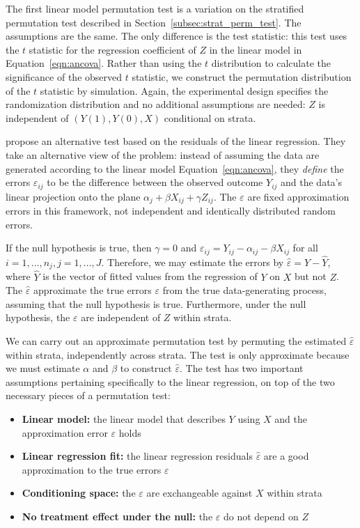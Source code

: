 \documentclass[12pt]{article}
\begin{document}
The first linear model permutation test is a variation on the stratified permutation test described in Section~\ref{subsec:strat_perm_test}.
The assumptions are the same.
The only difference is the test statistic:
this test uses the $t$ statistic for the regression coefficient of $Z$ in the linear model in Equation~\ref{eqn:ancova}.
Rather than using the $t$ distribution to calculate the significance of the observed $t$ statistic, we construct the permutation distribution of the $t$ statistic by simulation.
Again, the experimental design specifies the randomization distribution and no additional assumptions are needed:
$Z$ is independent of $(Y(1), Y(0), X)$ conditional on strata.

\citet{freedman_nonstochastic_1983} propose an alternative test based on the residuals of the linear regression.
They take an alternative view of the problem:
instead of assuming the data are generated according to the linear model Equation~\ref{eqn:ancova}, they \textit{define} the errors $\varepsilon_{ij}$ to be the difference between the observed outcome $Y_{ij}$ and the data's linear projection onto the plane $\alpha_j + \beta X_{ij}+ \gamma Z_{ij}$.
The $\varepsilon$ are fixed approximation errors in this framework, not independent and identically distributed random errors.

If the null hypothesis is true, then $\gamma = 0$ and $\varepsilon_{ij} = Y_{ij} - \alpha_{ij} - \beta X_{ij}$ for all $i = 1, \dots, n_j, j = 1, \dots, J$.
Therefore, we may estimate the errors by $\hat{\varepsilon} =Y - \hat{Y}$, where $\hat{Y}$ is the vector of fitted values from the regression of $Y$ on $X$ but not $Z$.
The $\hat{\varepsilon}$ approximate the true errors $\varepsilon$ from the true data-generating process, assuming that the null hypothesis is true.
Furthermore, under the null hypothesis, the $\varepsilon$ are independent of $Z$ within strata. 

We can carry out an approximate permutation test by permuting the estimated $\hat{\varepsilon}$ within strata, independently across strata.
The test is only approximate because we must estimate $\alpha$ and $\beta$ to construct $\hat{\varepsilon}$.
The test has two important assumptions pertaining specifically to the linear regression, on top of the two necessary pieces of a permutation test:
\begin{itemize}
\item \textbf{Linear model:} the linear model that describes $Y$ using $X$ and the approximation error $\varepsilon$ holds
\item \textbf{Linear regression fit:} the linear regression residuals $\hat{\varepsilon}$ are a good approximation to the true errors $\varepsilon$ 
\item \textbf{Conditioning space:} the $\varepsilon$ are exchangeable against $X$ within strata
\item \textbf{No treatment effect under the null:} the $\varepsilon$ do not depend on $Z$
\end{itemize}
\end{document}
